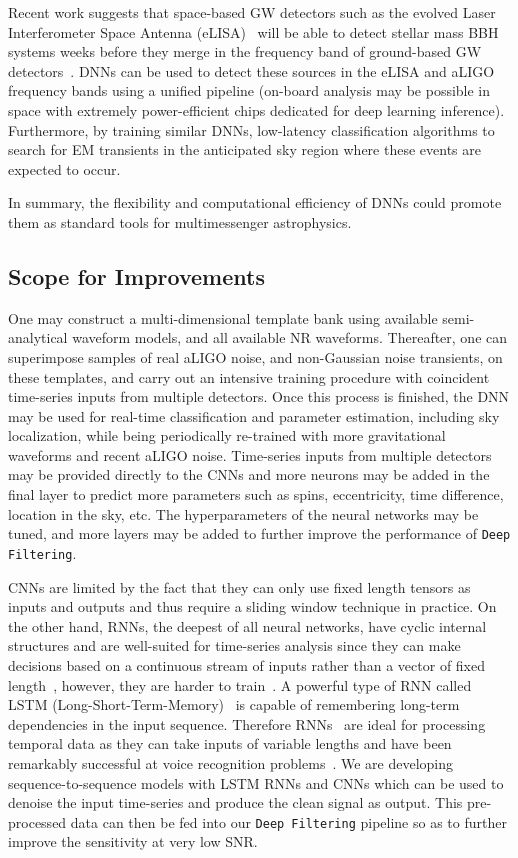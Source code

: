 \documentclass[aps,prd,%
amsmath,floats,floatfix, twocolumn, superscriptaddress,nofootinbib,showpacs]{revtex4-1}
\begin{document}
Recent work suggests that space-based GW detectors such as the evolved Laser Interferometer Space Antenna (eLISA)~\cite{PAmaro:2012CQG,GairL:2013} will be able to detect stellar mass BBH systems weeks before they merge in the frequency band of ground-based GW detectors~\cite{sesa:2016PhRvL}. DNNs can be used to detect these sources in the eLISA and aLIGO frequency bands using a unified pipeline (on-board analysis may be possible in space with extremely power-efficient chips dedicated for deep learning inference). Furthermore, by training similar DNNs, low-latency classification algorithms to search for EM transients in the anticipated sky region where these events are expected to occur.

In summary, the flexibility and computational efficiency of DNNs could promote them as standard tools for multimessenger astrophysics.

\subsection*{Scope for Improvements}

One may construct a multi-dimensional template bank using available semi-analytical waveform models, and all available NR waveforms. Thereafter, one can superimpose samples of real aLIGO noise, and non-Gaussian noise transients, on these templates, and carry out an intensive training procedure with coincident time-series inputs from multiple detectors. Once this process is finished, the DNN may be used for real-time classification and parameter estimation, including sky localization, while being periodically re-trained with more gravitational waveforms and recent aLIGO noise. Time-series inputs from multiple detectors may be provided directly to the CNNs and more neurons may be added in the final layer to predict more parameters such as spins, eccentricity, time difference, location in the sky, etc. The hyperparameters of the neural networks may be tuned, and more layers may be added to further improve the performance of \texttt{Deep Filtering}.

CNNs are limited by the fact that they can only use fixed length tensors as inputs and outputs and thus require a sliding window technique in practice. On the other hand, RNNs, the deepest of all neural networks, have cyclic internal structures and are well-suited for time-series analysis since they can make decisions based on a continuous stream of inputs rather than a vector of fixed length~\cite{DL-Review}, however, they are harder to train~\cite{DifficultyRNN}. A powerful type of RNN called LSTM (Long-Short-Term-Memory)~\cite{LSTM} is capable of remembering long-term dependencies in the input sequence. Therefore RNNs~\cite{DL-Review} are ideal for processing temporal data as they can take inputs of variable lengths and have been remarkably successful at voice recognition problems~\cite{SpeechRNN}. We are developing sequence-to-sequence models with LSTM RNNs and CNNs which can be used to denoise the input time-series and produce the clean signal as output. This pre-processed data can then be fed into our \texttt{Deep Filtering} pipeline so as to further improve the sensitivity at very low SNR.
\end{document}
